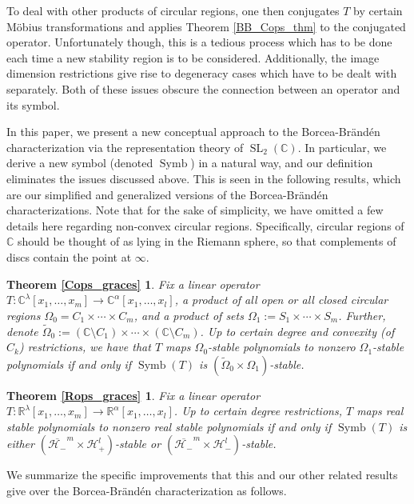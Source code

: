 \documentclass{article}
\theoremstyle{definition}
\theoremstyle{plain}
\newcommand{\C}{\mathbb{C}}
\newcommand{\R}{\mathbb{R}}
\newcommand{\UHP}{\mathcal{H}_+}
\newcommand{\LHP}{\mathcal{H}_-}
\DeclareMathOperator{\Symb}{Symb}
\DeclareMathOperator{\SL}{SL}
\begin{document}
To deal with other products of circular regions, one then conjugates $T$ by certain M{\"o}bius transformations and applies Theorem \ref{BB_Cops_thm} to the conjugated operator. Unfortunately though, this is a tedious process which has to be done each time a new stability region is to be considered. Additionally, the image dimension restrictions give rise to degeneracy cases which have to be dealt with separately. Both of these issues obscure the connection between an operator and its symbol.

In this paper, we present a new conceptual approach to the Borcea-Br{\"a}nd{\'e}n characterization via the representation theory of $\SL_2(\C)$. In particular, we derive a new symbol (denoted $\Symb$) in a natural way, and our definition eliminates the issues discussed above. This is seen in the following results, which are our simplified and generalized versions of the Borcea-Br{\"a}nd{\'e}n characterizations. Note that for the sake of simplicity, we have omitted a few details here regarding non-convex circular regions. Specifically, circular regions of $\C$ should be thought of as lying in the Riemann sphere, so that complements of discs contain the point at $\infty$.

\newtheorem*{Cops_graces}{Theorem \ref{Cops_graces}}
\begin{Cops_graces}
    Fix a linear operator $T: \C^\lambda[x_1,\ldots,x_m] \to \C^\alpha[x_1,\ldots,x_l]$, a product of all open or all closed circular regions $\Omega_0 = C_1 \times \cdots \times C_m$, and a product of sets $\Omega_1 := S_1 \times \cdots \times S_m$. Further, denote $\widetilde{\Omega}_0 := (\C \setminus C_1) \times \cdots \times (\C \setminus C_m)$. Up to certain degree and convexity (of $C_k$) restrictions, we have that $T$ maps $\Omega_0$-stable polynomials to nonzero $\Omega_1$-stable polynomials if and only if $\Symb(T)$ is $(\widetilde{\Omega}_0 \times \Omega_1)$-stable.
\end{Cops_graces}

\newtheorem*{Rops_graces}{Theorem \ref{Rops_graces}}
\begin{Rops_graces}
    Fix a linear operator $T: \R^\lambda[x_1,\ldots,x_m] \to \R^\alpha[x_1,\ldots,x_l]$. Up to certain degree restrictions, $T$ maps real stable polynomials to nonzero real stable polynomials if and only if $\Symb(T)$ is either $(\overline{\LHP}^m \times \UHP^l)$-stable or $(\overline{\LHP}^m \times \LHP^l)$-stable.
\end{Rops_graces}

We summarize the specific improvements that this and our other related results give over the Borcea-Br{\"a}nd{\'e}n characterization as follows.
\end{document}
